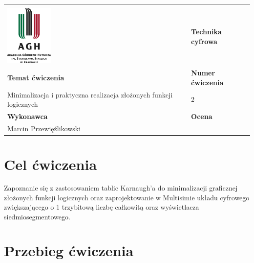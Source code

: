 \documentclass[12pt,a4paper]{article}
\begin{document}
\begin{table}[]
\label{my-label}
\begin{tabular}{|p{7.5cm}|p{7.5cm}|}
\hline
									           					&                           \\
\includegraphics[height=3cm]{logo}             					& \textbf{Technika cyfrowa} \\ \hline
\multicolumn{1}{|l|}{\textbf{Temat ćwiczenia}} 					& \textbf{Numer ćwiczenia}  \\
\multicolumn{1}{|l|}{Minimalizacja i praktyczna realizacja złożonych funkcji logicznych}	& 2                         \\ \hline
\multicolumn{1}{|l|}{\textbf{Wykonawca}}       & \textbf{Ocena}            \\
\multicolumn{1}{|l|}{Marcin Przewięźlikowski}          &                           \\ \hline
\end{tabular}
\end{table}

\section{Cel ćwiczenia}


Zapoznanie się z zastosowaniem tablic Karnaugh'a do minimalizacji graficznej złożonych funkcji logicznych oraz zaprojektowanie w Multisimie układu cyfrowego zwiększającego o 1 trzybitową liczbę całkowitą oraz wyświetlacza siedmiosegmentowego.

\section{Przebieg ćwiczenia}
\end{document}
